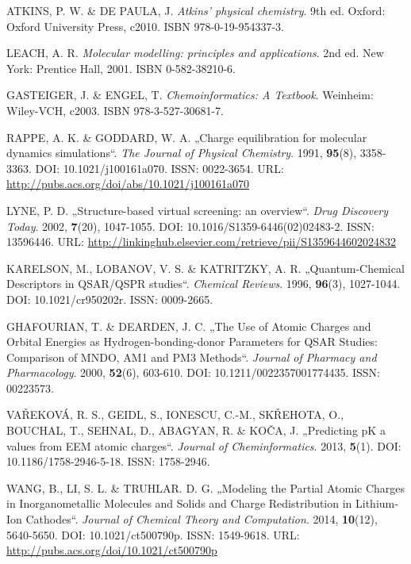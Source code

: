 \begin{thebibliography}{10}

ATKINS, P. W. \& DE PAULA, J. \textit{Atkins' physical chemistry}. 9th ed. Oxford: Oxford University Press, c2010. ISBN 978-0-19-954337-3.

LEACH, A. R. \textit{Molecular modelling: principles and applications}. 2nd ed. New York: Prentice Hall, 2001. ISBN 0-582-38210-6.

GASTEIGER, J. \& ENGEL, T. \textit{Chemoinformatics: A Textbook}. Weinheim: Wiley-VCH, c2003. ISBN 978-3-527-30681-7.

RAPPE, A. K. \& GODDARD, W. A. „Charge equilibration for molecular dynamics simulations“. \textit{The Journal of Physical Chemistry}. 1991, \textbf{95}(8), 3358-3363. DOI: 10.1021/j100161a070. ISSN: 0022-3654. URL: \url{http://pubs.acs.org/doi/abs/10.1021/j100161a070}

LYNE, P. D. „Structure-based virtual screening: an overview“. \textit{Drug Discovery Today}. 2002, \textbf{7}(20), 1047-1055. DOI: 10.1016/S1359-6446(02)02483-2. ISSN: 13596446. URL: \url{http://linkinghub.elsevier.com/retrieve/pii/S1359644602024832}

KARELSON, M., LOBANOV, V. S. \& KATRITZKY, A. R. „Quantum-Chemical Descriptors in QSAR/QSPR studies“. \textit{Chemical Reviews}. 1996, \textbf{96}(3), 1027-1044. DOI: 10.1021/cr950202r. ISSN: 0009-2665.

GHAFOURIAN, T. \& DEARDEN, J. C. „The Use of Atomic Charges and Orbital Energies as Hydrogen-bonding-donor Parameters for QSAR Studies: Comparison of MNDO, AM1 and PM3 Methods“. \textit{Journal of Pharmacy and Pharmacology}. 2000, \textbf{52}(6), 603-610. DOI: 10.1211/0022357001774435. ISSN: 00223573. 

VAŘEKOVÁ, R. S., GEIDL, S., IONESCU, C.-M., SKŘEHOTA, O., BOUCHAL, T., SEHNAL, D., ABAGYAN, R. \& KOČA, J. „Predicting pK a values from EEM atomic charges“. \textit{Journal of Cheminformatics}. 2013, \textbf{5}(1). DOI: 10.1186/1758-2946-5-18. ISSN: 1758-2946.

WANG, B., LI, S. L. \& TRUHLAR. D. G. „Modeling the Partial Atomic Charges in Inorganometallic Molecules and Solids and Charge Redistribution in Lithium-Ion Cathodes“. \textit{Journal of Chemical Theory and Computation}. 2014, \textbf{10}(12), 5640-5650. DOI: 10.1021/ct500790p. ISSN: 1549-9618. URL: \url{http://pubs.acs.org/doi/10.1021/ct500790p}


\end{thebibliography}
